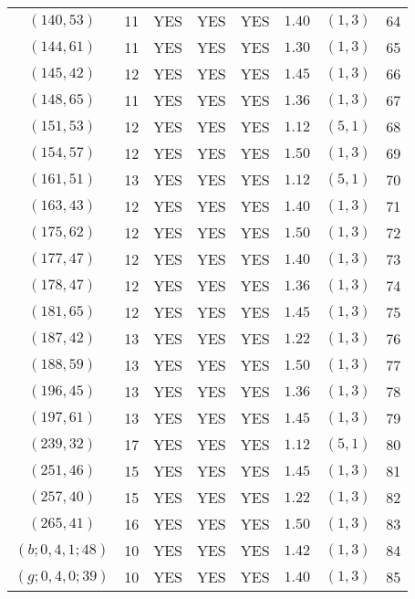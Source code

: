 \begin{longtable}{|c|c|c|c|c|c|c|c|}
$(140,53)$ & 11 & YES & YES & YES & $1.40$ & $(1,3)$ & 64\\
$(144,61)$ & 11 & YES & YES & YES & $1.30$ & $(1,3)$ & 65\\
$(145,42)$ & 12 & YES & YES & YES & $1.45$ & $(1,3)$ & 66\\
$(148,65)$ & 11 & YES & YES & YES & $1.36$ & $(1,3)$ & 67\\
$(151,53)$ & 12 & YES & YES & YES & $1.12$ & $(5,1)$ & 68\\
$(154,57)$ & 12 & YES & YES & YES & $1.50$ & $(1,3)$ & 69\\
$(161,51)$ & 13 & YES & YES & YES & $1.12$ & $(5,1)$ & 70\\
$(163,43)$ & 12 & YES & YES & YES & $1.40$ & $(1,3)$ & 71\\
$(175,62)$ & 12 & YES & YES & YES & $1.50$ & $(1,3)$ & 72\\
$(177,47)$ & 12 & YES & YES & YES & $1.40$ & $(1,3)$ & 73\\
$(178,47)$ & 12 & YES & YES & YES & $1.36$ & $(1,3)$ & 74\\
$(181,65)$ & 12 & YES & YES & YES & $1.45$ & $(1,3)$ & 75\\
$(187,42)$ & 13 & YES & YES & YES & $1.22$ & $(1,3)$ & 76\\
$(188,59)$ & 13 & YES & YES & YES & $1.50$ & $(1,3)$ & 77\\
$(196,45)$ & 13 & YES & YES & YES & $1.36$ & $(1,3)$ & 78\\
$(197,61)$ & 13 & YES & YES & YES & $1.45$ & $(1,3)$ & 79\\
$(239,32)$ & 17 & YES & YES & YES & $1.12$ & $(5,1)$ & 80\\
$(251,46)$ & 15 & YES & YES & YES & $1.45$ & $(1,3)$ & 81\\
$(257,40)$ & 15 & YES & YES & YES & $1.22$ & $(1,3)$ & 82\\
$(265,41)$ & 16 & YES & YES & YES & $1.50$ & $(1,3)$ & 83\\
$(b;0,4,1;48)$ & 10 & YES & YES & YES & $1.42$ & $(1,3)$ & 84\\
$(g;0,4,0;39)$ & 10 & YES & YES & YES & $1.40$ & $(1,3)$ & 85
\end{longtable}
